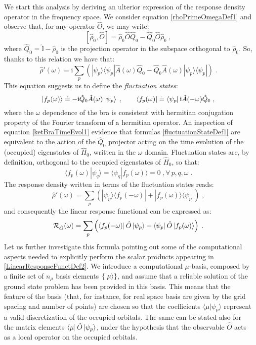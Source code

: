 \documentclass[a4paper]{article}
\newcommand{\ii}{\mathrm{i}}
\newcommand{\be}{\begin{equation}}
\newcommand{\ee}{\end{equation}}
\newcommand{\qq}{\qquad}
\newcommand{\lb}{\label}
\newcommand{\op}[1]{\hat {#1}}
\newcommand{\commutator}[2]{\left[ {#1} , {#2} \right]}
\newcommand{\brket}[2]{\langle  #1 | #2 \rangle} %
\newcommand{\ketbra}[2]{| #1 \rangle \langle #2 |}
\newcommand{\dmnot}{\op{\rho}_0}
\newcommand{\dm}{\op{\rho}}
\newcommand{\hnot}{\op{H}_0}
\newcommand{\identity}{\op{\mathbb I}}
\begin{document}
We start this analysis by deriving an ulterior expression of the response density operator in the frequency space. We consider equation \eqref{rhoPrimeOmegaDef1} and observe that, for any 
operator $\op O$, we may write:  
\be
\commutator{\dmnot}{\op O} = \dmnot \op O \op Q_0 - \op Q_0 \op O \dmnot\;,
\ee
where $\op Q_0= \identity - \dmnot$ is the projection operator in the subspace orthogonal to $\dmnot$. So, thanks to this relation we have that:
\be
\dm'(\omega) = \ii\sum_p\left(\ketbra{\psi_p}{\psi_p}\op A(\omega)\op Q_0 - \op Q_0\op A(\omega)\ketbra{\psi_p}{\psi_p}\right) \;.
\ee
This equation suggests us to define the \emph{fluctuation states}:
\be\lb{fluctuationStateDef1}
\ket{f_p(\omega)} \doteq -\ii\op Q_0\op A(\omega)\ket{\psi_p} \;, \qq
\bra{f_p(\omega)} \doteq \bra{\psi_p}\ii\op A(-\omega)\op Q_0 \;,
\ee
where the $\omega$ dependence of the bra is consistent with hermitian conjugation property of the Fourier transform of a hermitian operator. An inspection of equation \eqref{ketBraTimeEvol1} 
evidence that formulas \eqref{fluctuationStateDef1} are equivalent to the action of the $\op Q_0$ projector acting on the time evolution of the (occupied) eigenstates of $\hnot$, written 
in the $\omega$ domain. Fluctuation states are, by definition, orthogonal to the occupied eigenstates of $\hnot$, so that:
\be
\brket{f_p(\omega)}{\psi_q} = \brket{\psi_q}{f_p(\omega)} = 0 \;, \forall \, p,q,\omega \;.
\ee
The response density written in terms of the fluctuation states reads:
\be\lb{rhoPrimeFluctuationStateDef1}
\dm'(\omega) = \sum_p\left(\ketbra{\psi_p}{f_p(-\omega)} + \ketbra{f_p(\omega)}{\psi_p}\right) \;,
\ee
and consequently the linear response functional can be expressed as:
\be\lb{LinearResponseFunctDef2}
{\cal R}_{\op O}(\omega) = 
\sum_p\left(\bra{f_p(-\omega)}\op O\ket{\psi_p} + \bra{\psi_p}\op O\ket{f_p(\omega)}\right) \;.
\ee
Let us further investigate this formula pointing out some of the  computational aspects needed to explicitly perform the scalar products appearing in 
\eqref{LinearResponseFunctDef2}. 
We introduce a computational $\mu$-basis, composed by a finite set of $n_\mu$ basis elements $\{\ket{\mu}\}$, and assume that a reliable solution of the ground state problem has 
been provided in this basis. This means that the feature of the basis (that, for instance, for real space basis are given by the grid spacing and number of points) are chosen so 
that the coefficients $\brket{\mu}{\psi_p}$ represent a valid discretization of the occupied orbitals. The same can be stated also for the matrix elements $\bra{\mu}\op O\ket{\psi_p}$, 
under the hypothesis that the observable $\op O$ acts as a local operator on the occupied orbitals.  
\end{document}
